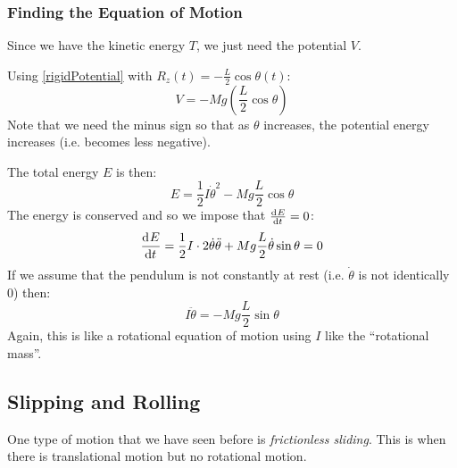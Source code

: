 \documentclass[../main.tex]{subfiles}
\begin{document}
\subsubsection{Finding the Equation of Motion}
Since we have the kinetic energy $T$, we just need the potential $V$.
\begin{center}
\end{center}
Using \cref{rigidPotential} with $R_z(t) = -\frac{L}{2} \cos \theta(t)$:
\[
  V = -Mg \left(\frac{L}{2} \cos \theta\right)
\]
Note that we need the minus sign so that as $\theta$ increases, the potential energy increases (i.e. becomes less negative).

The total energy $E$ is then:
\[
  E = \frac{1}{2}I \dot{\theta}^2 - Mg \frac{L}{2} \cos \theta
\]
The energy is conserved and so we impose that $\deriv{E}{t} = 0$:
\[
  \deriv{E}{t} = \frac{1}{2} I \cdot 2 \dot{\theta} \ddot{\theta} + Mg \frac{L}{2} \dot{\theta} \sin \theta = 0
\]
If we assume that the pendulum is not constantly at rest (i.e. $\dot{\theta}$ is not identically 0) then:
\[
  I \ddot{\theta} = - Mg \frac{L}{2} \sin \theta
\]
Again, this is like a rotational equation of motion using $I$ like the ``rotational mass''.
\subsection{Slipping and Rolling}
One type of motion that we have seen before is \textit{frictionless sliding}.
This is when there is translational motion but no rotational motion.
\end{document}

